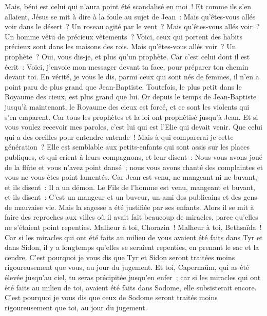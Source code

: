 \begin{multicols}{2}
Mais, béni est celui qui n'aura point été scandalisé en moi~!
Et comme ils s'en allaient, Jésus se mit à dire à la foule au sujet de Jean~: Mais qu'êtes-vous allés voir dans le désert~? Un roseau agité par le vent~?
Mais qu'êtes-vous allés voir~? Un homme vêtu de précieux vêtements~? Voici, ceux qui portent des habits précieux sont dans les maisons des rois.
Mais qu'êtes-vous allés voir~? Un prophète~? Oui, vous dis-je, et plus qu'un prophète.
Car c'est celui dont il est écrit~: Voici, j'envoie mon messager devant ta face, pour préparer ton chemin devant toi.
En vérité, je vous le dis, parmi ceux qui sont nés de femmes, il n'en a point paru de plus grand que Jean-Baptiste. Toutefois, le plus petit dans le Royaume des cieux, est plus grand que lui.
Or depuis le temps de Jean-Baptiste jusqu'à maintenant, le Royaume des cieux est forcé, et ce sont les violents qui s'en emparent.
Car tous les prophètes et la loi ont prophétisé jusqu'à Jean.
Et si vous voulez recevoir mes paroles, c'est lui qui est l'Elie qui devait venir.
Que celui qui a des oreilles pour entendre entende~!
Mais à qui comparerai-je cette génération~? Elle est semblable aux petits-enfants qui sont assis sur les places publiques, et qui crient à leurs compagnons,
et leur disent~: Nous vous avons joué de la flûte et vous n'avez point dansé~; nous vous avons chanté des complaintes et vous ne vous êtes point lamentés.
Car Jean est venu, ne mangeant ni ne buvant, et ils disent~: Il a un démon.
Le Fils de l'homme est venu, mangeant et buvant, et ils disent~: C'est un mangeur et un buveur, un ami des publicains et des gens de mauvaise vie. Mais la sagesse a été justifiée par ses enfants.
Alors il se mit à faire des reproches aux villes où il avait fait beaucoup de miracles, parce qu'elles ne s'étaient point repenties.
Malheur à toi, Chorazin~! Malheur à toi, Bethsaïda~! Car si les miracles qui ont été faits au milieu de vous avaient été faits dans Tyr et dans Sidon, il y a longtemps qu'elles se seraient repenties, en prenant le sac et la cendre.
C'est pourquoi je vous dis que Tyr et Sidon seront traitées moins rigoureusement que vous, au jour du jugement.
Et toi, Capernaüm, qui as été élevée jusqu'au ciel, tu seras précipitée jusqu'en enfer~; car si les miracles qui ont été faits au milieu de toi, avaient été faits dans Sodome, elle subsisterait encore.
C'est pourquoi je vous dis que ceux de Sodome seront traités moins rigoureusement que toi, au jour du jugement.

\end{multicols}
